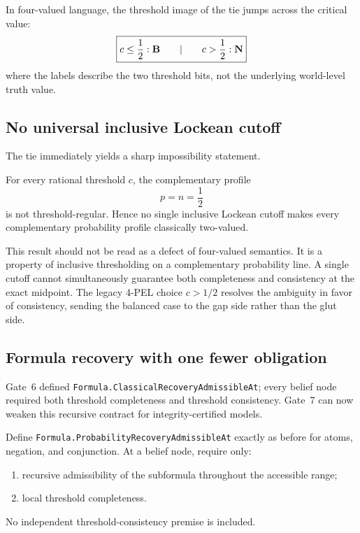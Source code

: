 In four-valued language, the threshold image of the tie jumps across the critical
value:
\[
  \boxed{
  c\le\frac12 : \mathbf{B}
  \qquad\vert\qquad
  c>\frac12 : \mathbf{N}
  }
\]
where the labels describe the two threshold bits, not the underlying world-level
truth value.

\subsection{No universal inclusive Lockean cutoff}

The tie immediately yields a sharp impossibility statement.

\begin{theorem}
\label{thm:no-universal-inclusive-threshold}
For every rational threshold \(c\), the complementary profile
\[
  p=n=\frac12
\]
is not threshold-regular.  Hence no single inclusive Lockean cutoff makes every
complementary probability profile classically two-valued.
\statusverified
\end{theorem}

This result should not be read as a defect of four-valued semantics.  It is a
property of inclusive thresholding on a complementary probability line.  A single
cutoff cannot simultaneously guarantee both completeness and consistency at the
exact midpoint.  The legacy 4-PEL choice \(c>1/2\) resolves the ambiguity in favor
of consistency, sending the balanced case to the gap side rather than the glut
side.

\subsection{Formula recovery with one fewer obligation}

Gate~6 defined \texttt{Formula.ClassicalRecoveryAdmissibleAt}; every belief node
required both threshold completeness and threshold consistency.  Gate~7 can now
weaken this recursive contract for integrity-certified models.

Define \texttt{Formula.ProbabilityRecoveryAdmissibleAt} exactly as before for atoms,
negation, and conjunction.  At a belief node, require only:
\begin{enumerate}[label=(\roman*)]
  \item recursive admissibility of the subformula throughout the accessible range;
  \item local threshold completeness.
\end{enumerate}
No independent threshold-consistency premise is included.

